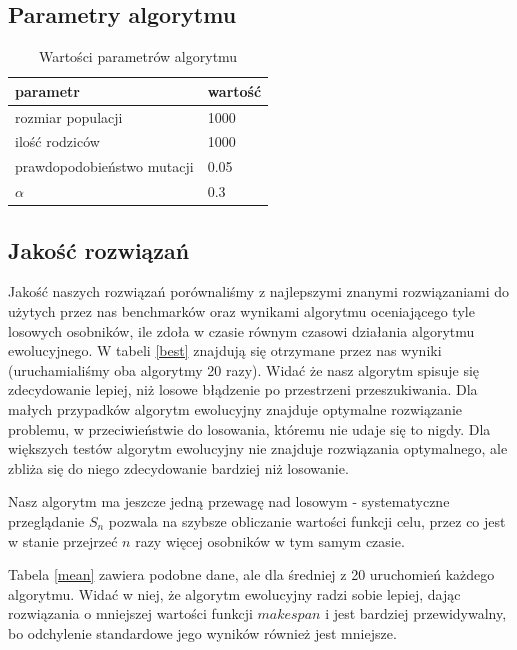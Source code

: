 \documentclass[11pt, a4wide]{article}
\begin{document}
\subsection{Parametry algorytmu}

\begin{table}[H]
\caption{Wartości parametrów algorytmu}
\label{parametry}
\begin{center}
\begin{tabular}{|l|l|}
  \hline
  parametr & wartość \\
  \hline
  rozmiar populacji & 1000 \\
  ilość rodziców & 1000 \\
  prawdopodobieństwo mutacji & 0.05 \\
  $\alpha$ & 0.3 \\
  \hline
\end{tabular}
\end{center}
\end{table}





\subsection{Jakość rozwiązań}

Jakość naszych rozwiązań porównaliśmy z najlepszymi znanymi rozwiązaniami do
użytych przez nas benchmarków \cite{inst} oraz wynikami algorytmu oceniającego
tyle losowych osobników, ile zdoła w czasie równym czasowi działania algorytmu
ewolucyjnego.  W tabeli \ref{best} znajdują się otrzymane przez nas wyniki
(uruchamialiśmy oba algorytmy 20 razy).  Widać że nasz algorytm spisuje się
zdecydowanie lepiej, niż losowe błądzenie po przestrzeni przeszukiwania. Dla
małych przypadków algorytm ewolucyjny znajduje optymalne rozwiązanie problemu,
w przeciwieństwie do losowania, któremu nie udaje się to nigdy. Dla większych
testów algorytm ewolucyjny nie znajduje rozwiązania optymalnego, ale zbliża się do
niego zdecydowanie bardziej niż losowanie.

Nasz algorytm ma jeszcze jedną przewagę nad losowym - systematyczne
przeglądanie $S_n$ pozwala na szybsze obliczanie wartości funkcji celu, przez
co jest w stanie przejrzeć $n$ razy więcej osobników w tym samym czasie.

Tabela \ref{mean} zawiera podobne dane, ale dla średniej z 20 uruchomień każdego
algorytmu. Widać w niej, że algorytm ewolucyjny radzi sobie lepiej, dając rozwiązania
o mniejszej wartości funkcji $makespan$ i jest bardziej przewidywalny, bo odchylenie
standardowe jego wyników również jest mniejsze.
\end{document}
